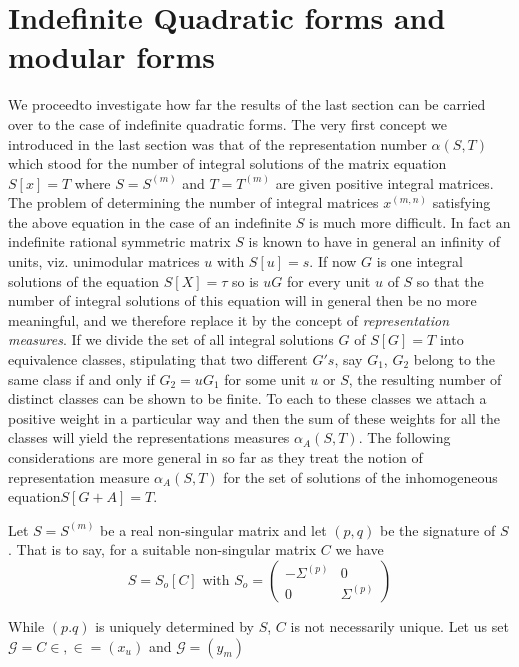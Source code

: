 

\chapter{Indefinite Quadratic forms and modular forms}%

We proceed\pageoriginale to investigate how far the results of the last
section can 
be carried over to the case of indefinite quadratic forms. The very
first concept we introduced in the last section was that of the
representation number $\alpha (S, T) $ which stood for the number of
integral solutions of the matrix equation $S[x] = T$ where $ S = S
^{(m)}$ and $ T = T^{ (m)}$ are given positive integral matrices. The
problem of determining the number of integral matrices $x^{(m, n)}$
satisfying the above equation in the case of an indefinite $S$ is 
much more difficult. In fact an indefinite rational symmetric matrix
$S$ is known to have in general an infinity of units, viz. unimodular
matrices $u$ with $ S[u] = s$. If now $G$ is one integral solutions of
the equation $S[X] = \tau$ so is $u G$ for every unit $u$ of $S$ so
that the number of integral solutions of this equation will in general
then be no more meaningful, and we therefore replace it by the
concept of \textit{representation measures}. If we divide the set of
all integral solutions $G$ of $S[G] = T$ into equivalence classes,
stipulating that two different $G' s$, say $G_1$, $G_2$ belong to the
same class if and only if $G_2 = u G_1$ for some unit $u$ or $S$, the
resulting number of distinct classes can be shown to be finite. To
each to these classes we attach a positive weight in a particular way
and then the sum of these weights for all the classes will yield the
representations measures $ \alpha _A (S, T)$. The following
considerations are more general in so far as they treat the notion of
representation measure $\alpha_A (S, T)$ for the set of solutions of
the inhomogeneous equation\pageoriginale $S[G +A] = T$.   

Let $S = S^{(m)}$ be a real non-singular matrix and let $(p, q )$ be
the signature of $S$. That is to say, for a suitable non-singular
matrix $C$ we have  
$$
S = S_ o [C] \text { with } S_o =\left ( \begin{smallmatrix} -
  \Sigma^{ (p)} & 0 \\ 0 & \Sigma^{ (p)} \end{smallmatrix} \right) 
$$

While $(p. q)$ is uniquely determined by $S$, $C$ is not necessarily
uni\-que. Let us set $ \mathscr{G} = C \in, \in = (x_u)$
and $\mathscr{G} = (y _m ) $ 

